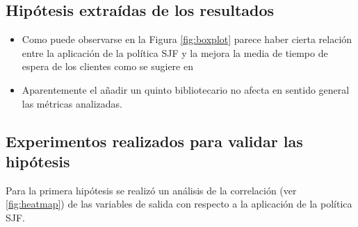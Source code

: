 \documentclass[10pt,twocolumn]{article}
\begin{document}
\subsection{Hipótesis extraídas de los resultados}
\begin{itemize}
	\item Como puede observarse en la Figura \ref{fig:boxplot} parece haber cierta relación entre la aplicación de la política SJF y la mejora la media de tiempo de espera de los clientes como se sugiere en \cite{modern_operating_systems}
	\item Aparentemente el añadir un quinto bibliotecario no afecta en sentido general las métricas analizadas.
\end{itemize}

\subsection{Experimentos realizados para validar las hipótesis}
Para la primera hipótesis se realizó un análisis de la correlación (ver \ref{fig:heatmap}) de las variables de salida con respecto a la aplicación de la política SJF.
\end{document}
